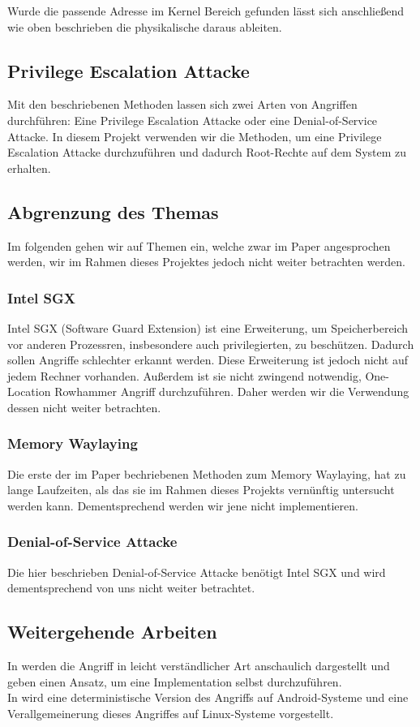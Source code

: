 \documentclass[conference]{IEEEtran}
\begin{document}
Wurde die passende Adresse im Kernel Bereich gefunden lässt sich anschließend wie oben beschrieben die physikalische daraus ableiten. 



\subsection{Privilege Escalation Attacke}
Mit den beschriebenen Methoden lassen sich zwei Arten von Angriffen durchführen: Eine Privilege Escalation Attacke oder eine Denial-of-Service Attacke. In diesem Projekt verwenden wir die Methoden, um eine Privilege Escalation Attacke durchzuführen und dadurch Root-Rechte auf dem System zu erhalten.



\subsection{Abgrenzung des Themas}
Im folgenden gehen wir auf Themen ein, welche zwar im Paper angesprochen werden, wir im Rahmen dieses Projektes jedoch nicht weiter betrachten werden.
\subsubsection{Intel SGX}
Intel SGX (Software Guard Extension) ist eine Erweiterung, um Speicherbereich vor anderen Prozessren, insbesondere auch privilegierten, zu beschützen. Dadurch sollen Angriffe schlechter erkannt werden. Diese Erweiterung ist jedoch nicht auf jedem Rechner vorhanden. Außerdem ist sie nicht zwingend notwendig, One-Location Rowhammer Angriff durchzuführen. Daher werden wir die Verwendung dessen nicht weiter betrachten.
\subsubsection{Memory Waylaying}
Die erste der im Paper bechriebenen Methoden zum Memory Waylaying, hat zu lange Laufzeiten, als das sie im Rahmen dieses Projekts vernünftig untersucht werden kann. Dementsprechend werden wir jene nicht implementieren.
\subsubsection{Denial-of-Service Attacke}
Die hier beschrieben Denial-of-Service Attacke benötigt Intel SGX und wird dementsprechend von uns nicht weiter betrachtet.
\subsection{Weitergehende Arbeiten}
In \cite{seaborn2015} werden die Angriff in leicht verständlicher Art anschaulich dargestellt und geben einen Ansatz, um eine Implementation selbst durchzuführen.\\
In \cite{vanderVeen:2016:DDR:2976749.2978406} wird eine deterministische Version des Angriffs auf Android-Systeme und eine Verallgemeinerung dieses Angriffes auf Linux-Systeme vorgestellt.
\end{document}
